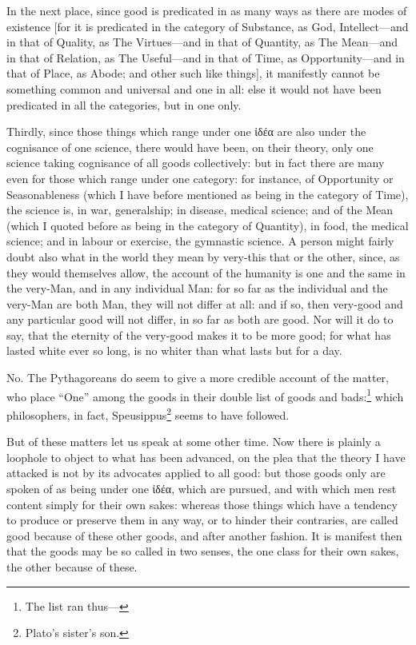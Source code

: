 In the next place, since good is predicated in as many ways as there are modes
of existence [for it is predicated in the category of Substance, as God,
Intellect—and in that of Quality, as The Virtues—and in that of
Quantity, as The Mean—and in that of Relation, as The Useful—and in
that of Time, as Opportunity—and in that of Place, as Abode; and other
such like things], it manifestly cannot be something common and universal and
one in all: else it would not have been predicated in all the categories, but
in one only.

Thirdly, since those things which range under one ἰδέα
are also under the cognisance of one science, there would have been, on their
theory, only one science taking cognisance of all goods collectively: but in
fact there are many even for those which range under one category: for
instance, of Opportunity or Seasonableness (which I have before mentioned as
being in the category of Time), the science is, in war, generalship; in
disease, medical science; and of the Mean (which I quoted before as being in
the category of Quantity), in food, the medical science; and in labour or
exercise, the gymnastic science. A person might fairly doubt also what in the
world they mean by very-this that or the other, since, as they would themselves
allow, the account of the humanity is one and the same in the very-Man, and in
any individual Man: for so far as the individual and the very-Man are both Man,
they will not differ at all: and if so, then very-good and any particular good
will not differ, in so far as both are good. Nor will it do to say, that the
eternity of the very-good makes it to be more good; for what has lasted white
ever so long, is no whiter than what lasts but for a day.

No. The Pythagoreans do seem to give a more credible account of the matter, who
place “One” among the goods in their double list of goods and
bads:\footnote{The list ran thus—}
which philosophers, in fact, Speusippus\footnote{Plato’s sister’s son.}
seems to have followed.

But of these matters let us speak at some other time. Now there is plainly a
loophole to object to what has been advanced, on the plea that the theory I
have attacked is not by its advocates applied to all good: but those goods only
are spoken of as being under one ἰδέα, which are pursued,
and with which men rest content simply for their own sakes: whereas those
things which have a tendency to produce or preserve them in any way, or to
hinder their contraries, are called good because of these other goods, and
after another fashion. It is manifest then that the goods may be so called in
two senses, the one class for their own sakes, the other because of these.

